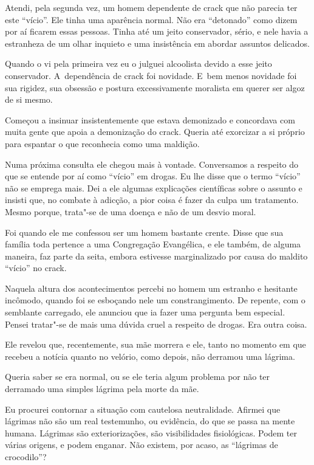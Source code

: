  

Atendi, pela segunda vez, um homem dependente de crack que não parecia
ter este ``vício''. Ele tinha uma aparência normal. Não era ``detonado''
como dizem por aí ficarem essas pessoas. Tinha até um jeito conservador,
sério, e nele havia a estranheza de um olhar inquieto e uma insistência
em abordar assuntos delicados.

Quando o vi pela primeira vez eu o julguei alcoolista devido a esse
jeito conservador. A~dependência de crack foi novidade. E~bem menos
novidade foi sua rigidez, sua obsessão e postura excessivamente
moralista em querer ser algoz de si mesmo.

Começou a insinuar insistentemente que estava demonizado e concordava
com muita gente que apoia a demonização do crack. Queria até exorcizar a
si próprio para espantar o que reconhecia como uma maldição.

\asterisc{}

Numa próxima consulta ele chegou mais à vontade. Conversamos a respeito
do que se entende por aí como ``vício'' em drogas. Eu lhe disse que o
termo ``vício'' não se emprega mais. Dei a ele algumas explicações
científicas sobre o assunto e insisti que, no combate à adicção, a pior
coisa é fazer da culpa um tratamento. Mesmo porque, trata"-se de uma
doença e não de um desvio moral.

Foi quando ele me confessou ser um homem bastante crente. Disse que sua
família toda pertence a uma Congregação Evangélica, e ele também, de
alguma maneira, faz parte da seita, embora estivesse marginalizado por
causa do maldito ``vício'' no crack.

Naquela altura dos acontecimentos percebi no homem um estranho e
hesitante incômodo, quando foi se esboçando nele um constrangimento. De
repente, com o semblante carregado, ele anunciou que ia fazer uma
pergunta bem especial. Pensei tratar"-se de mais uma dúvida cruel a
respeito de drogas. Era outra coisa.

Ele revelou que, recentemente, sua mãe morrera e ele, tanto no momento
em que recebeu a notícia quanto no velório, como depois, não derramou
uma lágrima.

Queria saber se era normal, ou se ele teria algum problema por não ter
derramado uma simples lágrima pela morte da mãe.

Eu procurei contornar a situação com cautelosa neutralidade. Afirmei que
lágrimas não são um real testemunho, ou evidência, do que se passa na
mente humana. Lágrimas são exteriorizações, são visibilidades
fisiológicas. Podem ter várias origens, e podem enganar. Não existem,
por acaso, as ``lágrimas de crocodilo''?


